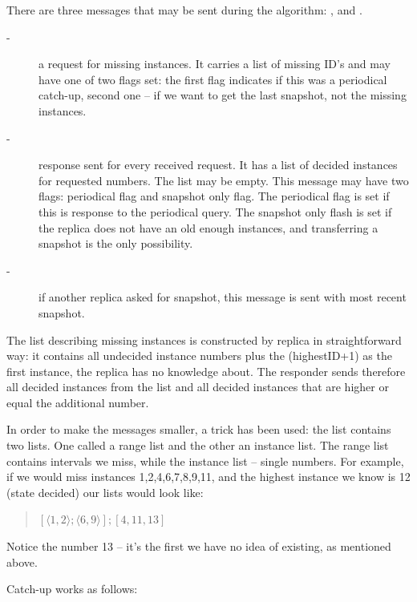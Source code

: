There are three messages that may be sent during the algorithm: \catchUpQuery[], \catchUpResponse and \catchUpSnapshot[].
\begin{description}
 \item[\normalfont\catchUpQuery -] a request for missing instances. It carries a list of missing ID's and may have one of two flags set: the first flag indicates if this was a periodical catch-up, second one -- 
 if we want to get the last snapshot, not the missing instances.
 \item[\normalfont\catchUpResponse -] response sent for every received request. It has a list of decided instances for requested numbers. The list may be empty. This message may have two flags: periodical flag and snapshot only flag. The periodical flag is set if this is response to the periodical query. The snapshot only flash is set if the replica does not have an old enough instances, and transferring a snapshot is the only possibility.
 \item[\normalfont\catchUpSnapshot -] if another replica asked for snapshot, this message is sent with most recent snapshot.
\end{description}

The list describing missing instances is constructed by replica in straightforward way: it contains all undecided instance numbers plus the (highestID+1) as the first instance, the replica has no knowledge about. The responder sends therefore all decided instances from the list and all decided instances that are higher or equal the additional number.

In order to make the messages smaller, a trick has been used: the list contains two lists. One called a range list and the other an instance list.
The range list contains intervals we miss, while the instance list -- single numbers. For example, if we would miss instances 1,2,4,6,7,8,9,11, and the highest instance we know is 12 (state decided) our lists would look like:
\begin{quote}
$[\langle1,2\rangle; \langle6,9\rangle]; [4,11,13]$
\end{quote} 
Notice the number 13 -- it's the first we have no idea of existing, as mentioned above.

Catch-up works as follows:

